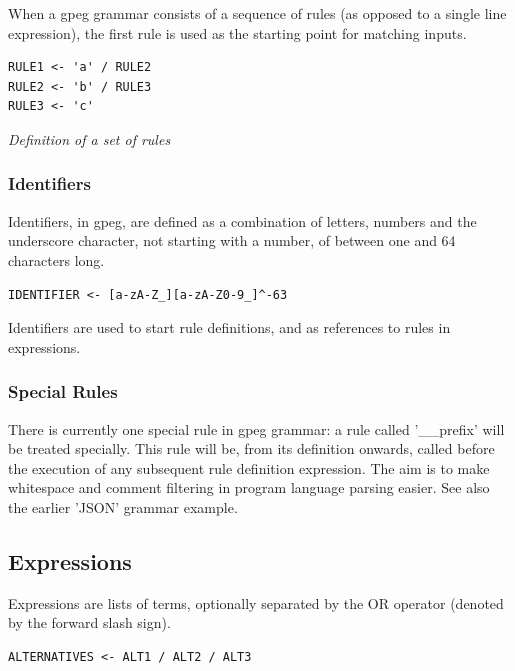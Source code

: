 When a gpeg grammar consists of a sequence of rules
(as opposed to a single line expression),
the first rule is used as the starting point for matching inputs.

\begin{myquote}
\begin{verbatim}
RULE1 <- 'a' / RULE2
RULE2 <- 'b' / RULE3
RULE3 <- 'c'
\end{verbatim}
\end{myquote}
\textit{Definition of a set of rules}

\subsubsection{Identifiers}

Identifiers, in gpeg, are defined as a combination of letters,
numbers and the underscore character, not starting with a number,
of between one and 64 characters long.

\begin{myquote}
\begin{verbatim}
IDENTIFIER <- [a-zA-Z_][a-zA-Z0-9_]^-63
\end{verbatim}
\end{myquote}

Identifiers are used to start rule definitions, and as references
to rules in expressions.

\subsubsection{Special Rules}

There is currently one special rule in gpeg grammar: a rule called
'\_\_prefix' will be treated specially. This rule will be, from its
definition onwards, called before the execution of any subsequent rule
definition expression. The aim is to make whitespace and comment filtering
in program language parsing easier. See also the earlier 'JSON' grammar
example.

\subsection{Expressions}

Expressions are lists of terms, optionally separated by the
OR operator (denoted by the forward slash sign).

\begin{myquote}
\begin{verbatim}
ALTERNATIVES <- ALT1 / ALT2 / ALT3
\end{verbatim}
\end{myquote}

